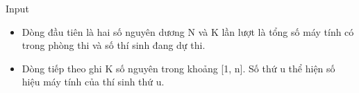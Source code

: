 Input
\begin{itemize}
	\item     Dòng đầu tiên là hai số nguyên dương N và K lần lượt là tổng số máy tính có trong phòng thi và số thí sinh đang dự thi.   
	\item     Dòng tiếp theo ghi K số nguyên trong khoảng [1, n]. Số thứ u thể hiện số hiệu máy tính của thí sinh thứ u.   
\end{itemize}